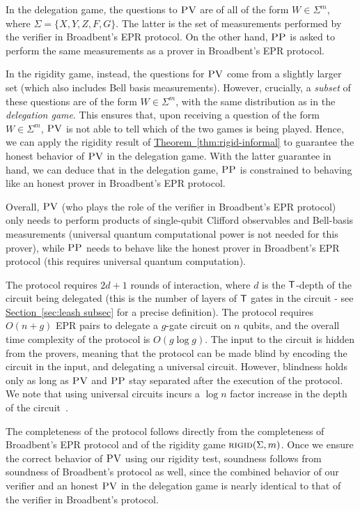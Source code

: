 \documentclass[11pt]{article}
\numberwithin{equation}{section}
\theoremstyle{definition}
\theoremstyle{plain}
\newcommand{\expref}[2]{\hyperref[#2]{#1~\ref{#2}}}
\newcommand{\rigid}{\textsc{rigid}}
\newcommand{\pv}{\textsc{PV}}
\newcommand{\pp}{\textsc{PP}}
\begin{document}
In the delegation game, the questions to $\pv$ are of all of the form $W\in \Sigma^m$, where $\Sigma = \{X,Y,Z,F,G\}$. The latter is the set of measurements performed by the verifier in Broadbent's EPR protocol. On the other hand, $\pp$ is asked to perform the same measurements as a prover in Broadbent's EPR protocol.

In the rigidity game, instead, the questions for $\pv$ come from a slightly larger set (which also includes Bell basis measurements). However, crucially, a \emph{subset} of these questions are of the form $W\in \Sigma^m$, with the same distribution as in the \emph{delegation game}. This ensures that, upon receiving a question of the form $W\in \Sigma^m$, $\pv$ is not able to tell which of the two games is being played. Hence, we can apply the rigidity result of \expref{Theorem}{thm:rigid-informal} to guarantee the honest behavior of $\pv$ in the delegation game. With the latter guarantee in hand, we can deduce that in the delegation game, $\pp$ is constrained to behaving like an honest prover in Broadbent's EPR protocol.

Overall, $\pv$ (who plays the role of the verifier in Broadbent's EPR protocol) only needs to perform
products of single-qubit Clifford observables and Bell-basis measurements (universal quantum
computational power is not needed for this prover), while $\pp$ needs to behave like the honest prover in Broadbent's EPR protocol (this requires universal quantum computation).

The protocol requires $2d+1$ rounds of interaction, where $d$ is the $\sf T$-depth of the circuit being delegated (this is the number of layers of $\sf T$ gates in the circuit - see \expref{Section}{sec:leash subsec} for a precise definition). The protocol requires $O(n+g)$ EPR pairs to delegate a $g$-gate circuit on $n$ qubits, and the overall time complexity of the protocol is $O(g\log g)$.
The input to the circuit is hidden from the provers, meaning that the protocol can be made blind by encoding the circuit in the input, and delegating a universal circuit. However, blindness holds only as long as $\pv$ and $\pp$ stay separated after the execution of the protocol. We note that using universal circuits incurs a $\log{n}$ factor increase in the depth of the circuit~\cite{BeraFGH10}.

The completeness of the protocol follows directly from the completeness of Broadbent's EPR protocol and of the rigidity game $\rigid(\Sigma,m)$. Once we ensure the correct behavior of $\pv$ using our rigidity test, soundness follows from soundness of Broadbent's protocol as well, since the combined behavior of our verifier and an honest $\pv$ in the delegation game is nearly identical to that of the verifier in Broadbent's protocol.
\end{document}
